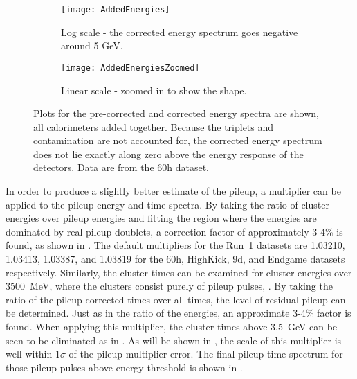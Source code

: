     \begin{figure}
    \centering
        \begin{subfigure}[]{0.45\textwidth}
            \centering
            \texttt{[image: AddedEnergies]}
            \caption{Log scale - the corrected energy spectrum goes negative around 5 GeV.}
        \end{subfigure}%
        \hspace{1cm}
        \begin{subfigure}[]{0.45\textwidth}
            \centering
            \texttt{[image: AddedEnergiesZoomed]}
            \caption{Linear scale - zoomed in to show the shape.}
        \end{subfigure}
    \caption[Non-corrected and pileup corrected cluster energies]{Plots for the pre-corrected and corrected energy spectra are shown, all calorimeters added together. Because the triplets and contamination are not accounted for, the corrected energy spectrum does not lie exactly along zero above the energy response of the detectors. Data are from the 60h dataset.}
    \label{fig:AddedEnergies}
    \end{figure}



In order to produce a slightly better estimate of the pileup, a multiplier can be applied to the pileup energy and time spectra. By taking the ratio of cluster energies over pileup energies and fitting the region where the energies are dominated by real pileup doublets, a correction factor of approximately 3-4\% is found, as shown in . The default multipliers for the Run~1 datasets are 1.03210, 1.03413, 1.03387, and 1.03819 for the 60h, HighKick, 9d, and Endgame datasets respectively. Similarly, the cluster times can be examined for cluster energies over \SI{3500}{\MeV}, where the clusters consist purely of pileup pulses, . By taking the ratio of the pileup corrected times over all times, the level of residual pileup can be determined. Just as in the ratio of the energies, an approximate 3-4\% factor is found. When applying this multiplier, the cluster times above \SI{3.5}{\GeV} can be seen to be eliminated as in . As will be shown in , the scale of this multiplier is well within $1\sigma$ of the pileup multiplier error. The final pileup time spectrum for those pileup pulses above energy threshold is shown in . 


